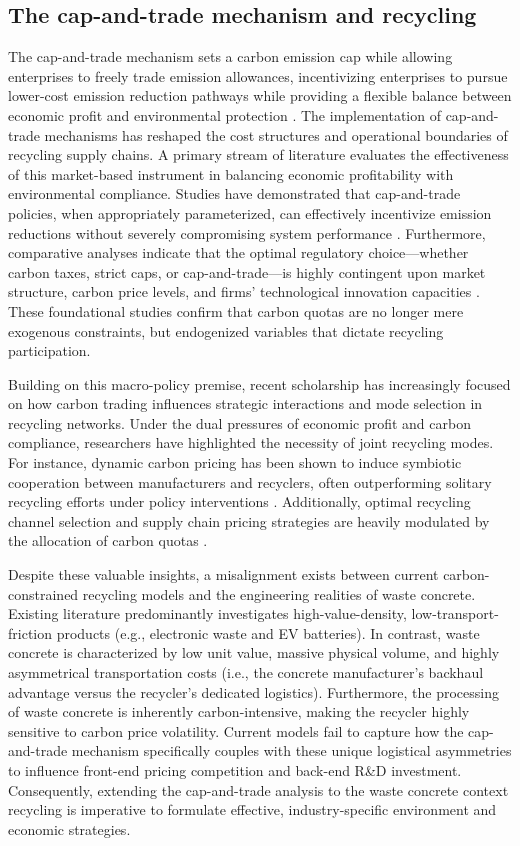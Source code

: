\documentclass[authoryear,preprint,review,times,10pt]{elsarticle}
\begin{document}
\subsection{The cap-and-trade mechanism and recycling}
The cap-and-trade mechanism sets a carbon emission cap while allowing enterprises to freely trade emission allowances, incentivizing enterprises to pursue lower-cost emission reduction pathways while providing a flexible balance between economic profit and environmental protection \citep{li2019How}. The implementation of cap-and-trade mechanisms has reshaped the cost structures and operational boundaries of recycling supply chains. A primary stream of literature evaluates the effectiveness of this market-based instrument in balancing economic profitability with environmental compliance. Studies have demonstrated that cap-and-trade policies, when appropriately parameterized, can effectively incentivize emission reductions without severely compromising system performance \citep{bai2022Distributionally}. Furthermore, comparative analyses indicate that the optimal regulatory choice—whether carbon taxes, strict caps, or cap-and-trade—is highly contingent upon market structure, carbon price levels, and firms' technological innovation capacities \citep{lyu2022Manufacturers,huang2024Optimal}. These foundational studies confirm that carbon quotas are no longer mere exogenous constraints, but endogenized variables that dictate recycling participation.

Building on this macro-policy premise, recent scholarship has increasingly focused on how carbon trading influences strategic interactions and mode selection in recycling networks. Under the dual pressures of economic profit and carbon compliance, researchers have highlighted the necessity of joint recycling modes. For instance, dynamic carbon pricing has been shown to induce symbiotic cooperation between manufacturers and recyclers, often outperforming solitary recycling efforts under policy interventions \citep{cao2023Developing,wu2024Electric}. Additionally, optimal recycling channel selection and supply chain pricing strategies are heavily modulated by the allocation of carbon quotas \citep{zhang2022Recycling}.

Despite these valuable insights, a misalignment exists between current carbon-constrained recycling models and the engineering realities of waste concrete. Existing literature predominantly investigates high-value-density, low-transport-friction products (e.g., electronic waste and EV batteries). In contrast, waste concrete is characterized by low unit value, massive physical volume, and highly asymmetrical transportation costs (i.e., the concrete manufacturer's backhaul advantage versus the recycler's dedicated logistics). Furthermore, the processing of waste concrete is inherently carbon-intensive, making the recycler highly sensitive to carbon price volatility. Current models fail to capture how the cap-and-trade mechanism specifically couples with these unique logistical asymmetries to influence front-end pricing competition and back-end R\&D investment. Consequently, extending the cap-and-trade analysis to the waste concrete context recycling is imperative to formulate effective, industry-specific environment and economic strategies.
\end{document}
